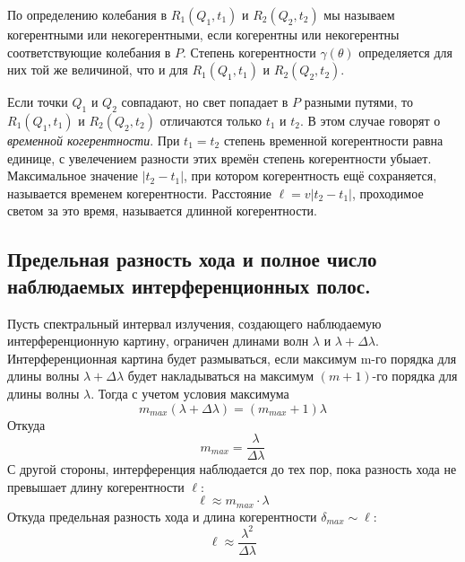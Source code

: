 	По определению колебания в $R_{1}(Q_{1},t_{1})$ и $R_{2}(Q_{2},t_{2})$ мы называем когерентными или некогерентными, если когерентны или некогерентны соответствующие колебания в $P$. Степень когерентности $\gamma(\theta)$ определяется для них  той же величиной, что и для $R_{1}(Q_{1},t_{1})$ и $R_{2}(Q_{2},t_{2})$.
	
	Если точки $Q_{1}$ и $Q_{2}$ совпадают, но свет попадает в $P$ разными путями, то $R_{1}(Q_{1},t_{1})$ и $R_{2}(Q_{2},t_{2})$ отличаются только $t_{1}$ и $t_{2}$. В этом случае говорят о \textit{временной когерентности}. При $t_{1} = t_{2}$ степень временной когерентности равна единице,  с увелечением  разности этих времён степень когерентности убыает. Максимальное значение $|t_{2} - t_{1}|$, при котором когерентность ещё сохраняется, называется временем когерентности. Расстояние $\ell = v|t_{2} - t_{1}|$, проходимое светом за это время, называется длинной когерентности.
	   \subsection{Предельная разность хода и полное число наблюдаемых интерференционных полос.}
	   Пусть спектральный интервал излучения, создающего наблюдаемую
	   интерференционную картину, ограничен длинами волн $\lambda$ и $\lambda + \Delta \lambda$.
	   Интерференционная картина будет размываться, если максимум m-го порядка
	   для длины волны $\lambda + \Delta \lambda$ будет накладываться на максимум
	   $(m + 1)$-го порядка для длины волны $\lambda$. Тогда с учетом условия максимума
	   \begin{equation*}
	   m_{max}(\lambda + \Delta\lambda) = (m_{max} + 1) \lambda 
	   \end{equation*}
	   Откуда
		\begin{equation}
		\boxed{m_{max} = \frac{\lambda}{\Delta \lambda}}
		\end{equation}   
		С другой стороны, интерференция наблюдается до тех пор, пока разность
		хода не превышает длину когерентности $\ell$:
		\begin{equation*}
		\ell \approx m_{max}\cdot \lambda
		\end{equation*}
		Откуда предельная разность хода и длина когерентности $\delta_{max} \sim \ell$:
		\begin{equation}
		\boxed{\ell \approx \frac{\lambda^{2}}{\Delta \lambda}}
		\end{equation}